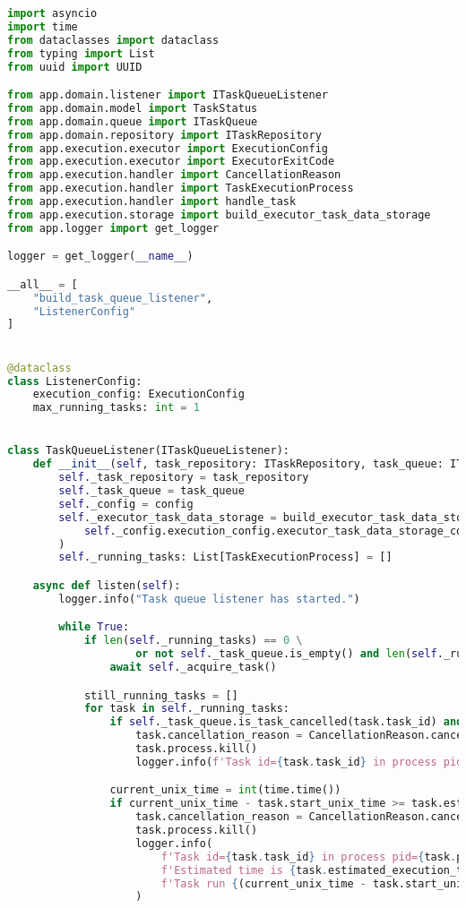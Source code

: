 \begin{lstlisting}[language=Python, caption=execution/listener.py, captionpos=b]
import asyncio
import time
from dataclasses import dataclass
from typing import List
from uuid import UUID

from app.domain.listener import ITaskQueueListener
from app.domain.model import TaskStatus
from app.domain.queue import ITaskQueue
from app.domain.repository import ITaskRepository
from app.execution.executor import ExecutionConfig
from app.execution.executor import ExecutorExitCode
from app.execution.handler import CancellationReason
from app.execution.handler import TaskExecutionProcess
from app.execution.handler import handle_task
from app.execution.storage import build_executor_task_data_storage
from app.logger import get_logger

logger = get_logger(__name__)

__all__ = [
    "build_task_queue_listener",
    "ListenerConfig"
]


@dataclass
class ListenerConfig:
    execution_config: ExecutionConfig
    max_running_tasks: int = 1


class TaskQueueListener(ITaskQueueListener):
    def __init__(self, task_repository: ITaskRepository, task_queue: ITaskQueue, config: ListenerConfig):
        self._task_repository = task_repository
        self._task_queue = task_queue
        self._config = config
        self._executor_task_data_storage = build_executor_task_data_storage(
            self._config.execution_config.executor_task_data_storage_config
        )
        self._running_tasks: List[TaskExecutionProcess] = []

    async def listen(self):
        logger.info("Task queue listener has started.")

        while True:
            if len(self._running_tasks) == 0 \
                    or not self._task_queue.is_empty() and len(self._running_tasks) < self._config.max_running_tasks:
                await self._acquire_task()

            still_running_tasks = []
            for task in self._running_tasks:
                if self._task_queue.is_task_cancelled(task.task_id) and task.cancellation_reason is None:
                    task.cancellation_reason = CancellationReason.cancelled_by_user
                    task.process.kill()
                    logger.info(f'Task id={task.task_id} in process pid={task.process.pid} cancelled by user.')

                current_unix_time = int(time.time())
                if current_unix_time - task.start_unix_time >= task.estimated_execution_time_sec:
                    task.cancellation_reason = CancellationReason.cancelled_by_timeout_limit
                    task.process.kill()
                    logger.info(
                        f'Task id={task.task_id} in process pid={task.process.pid} cancelled by time limit. '
                        f'Estimated time is {task.estimated_execution_time_sec / 60} min. '
                        f'Task run {(current_unix_time - task.start_unix_time) / 60} min.'
                    )


\end{lstlisting}
